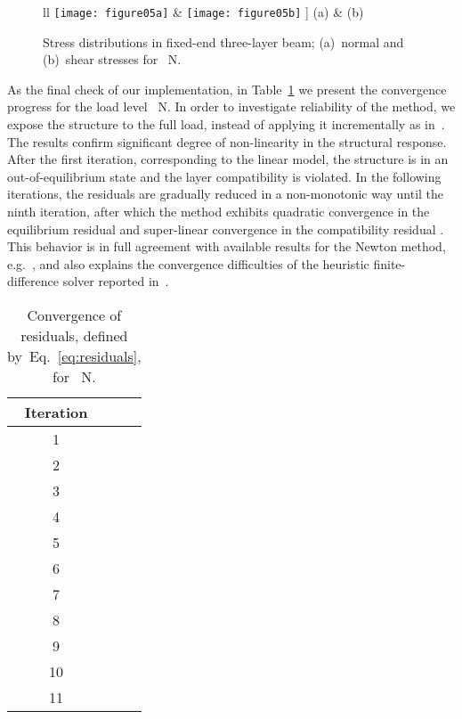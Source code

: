 \documentclass[11pt]{article}
\newcommand{\rev}[1]{#1}
\newcommand{\Eref}[1]{Eq.~\eqref{#1}}
\newcommand{\Tref}[1]{Table~\ref{#1}}
\begin{document}
\begin{figure}[h]
\begin{tabular}{ll}
\texttt{[image: figure05a]} & 
\texttt{[image: figure05b]} \-2mm]
(a) & (b)
\end{tabular}
\caption{\rev{Stress distributions in fixed-end three-layer beam; (a)~normal and
(b)~shear stresses for ~N.}}
\label{fig:stress_distrib}
\end{figure}


As the final check of our implementation, in \Tref{tab:convergence_progress} we
present the convergence progress for the load level ~N. In order to
investigate reliability of the method, we expose the structure to the full load,
instead of applying it incrementally as in~\cite{Asik:2005:MMB}. The results
confirm significant degree of non-linearity in the structural response. After
the first iteration, corresponding to the linear model, the structure is in an
out-of-equilibrium state and the layer compatibility is violated. In the
following iterations, the residuals are gradually reduced \rev{in a
non-monotonic way} until the ninth iteration, after which the method exhibits
quadratic convergence in the equilibrium residual  and super-linear
convergence in the compatibility residual . This behavior is in full
agreement with available results for the Newton method,
e.g.~\cite[Theorem~13.6]{Bonnans:2003:NOTPA}, and also explains the convergence
difficulties of the heuristic finite-difference solver reported
in~\cite{Asik:2005:MMB}.

\begin{table}[h]
\caption{Convergence of residuals, \rev{defined by~\Eref{eq:residuals}}, for
~N.}
\label{tab:convergence_progress}
\centering
\begin{tabular}{crr}
\hline 
Iteration  & 
\multicolumn{1}{c}{} & 
\multicolumn{1}{c}{} \\
\hline 
 1 &  &  \\
 2 &  &  \\
 3 &  &  \\
 4 &  &  \\
 5 &  &  \\
 6 &  &  \\
 7 &  &  \\
 8 &  &  \\
 9 &  &  \\
10 &  &  \\
11 &  &  \\
\hline
\end{tabular}
\end{table}
\end{document}
